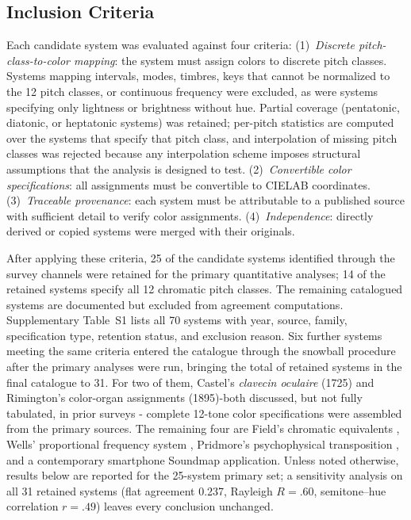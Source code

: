 \documentclass[12pt]{article}
\begin{document}
\subsection{Inclusion Criteria}
Each candidate system was evaluated against four criteria:
(1)~\textit{Discrete pitch-class-to-color mapping}: the system must
assign colors to discrete pitch classes. Systems mapping intervals,
modes, timbres, keys that cannot be normalized to the 12 pitch
classes, or continuous frequency were excluded, as were systems
specifying only lightness or brightness without hue. Partial coverage
(pentatonic, diatonic, or heptatonic systems) was retained; per-pitch
statistics are computed over the systems that specify that pitch
class, and interpolation of missing pitch classes was rejected because
any interpolation scheme imposes structural assumptions that the
analysis is designed to test.
(2)~\textit{Convertible color specifications}: all assignments must
be convertible to CIELAB coordinates.
(3)~\textit{Traceable provenance}: each system must be attributable to
a published source with sufficient detail to verify color assignments.
(4)~\textit{Independence}: directly derived or copied systems were
merged with their originals.

After applying these criteria, 25 of the candidate systems identified
through the survey channels were retained for the primary quantitative
analyses; 14 of the retained systems specify all 12 chromatic pitch
classes. The remaining catalogued systems are documented but excluded
from agreement computations. Supplementary Table~S1 lists all 70
systems with year, source, family, specification type, retention
status, and exclusion reason.
Six further systems meeting the same criteria entered the catalogue
through the snowball procedure after the primary analyses were run,
bringing the total of retained systems in the final catalogue to 31.
For two of them, Castel's \textit{clavecin oculaire} (1725) and
Rimington's color-organ assignments (1895)-both discussed, but not
fully tabulated, in prior surveys \citep{peacock1988,gage1999}-%
complete 12-tone color specifications were assembled from the primary
sources. The remaining four are Field's chromatic equivalents
\citep{field1835}, Wells' proportional frequency system
\citep{wells1980}, Pridmore's psychophysical transposition
\citep{pridmore1992}, and a contemporary smartphone Soundmap
application. Unless noted otherwise, results below are reported for
the 25-system primary set; a sensitivity analysis on all 31 retained
systems (flat agreement 0.237, Rayleigh $R = .60$, semitone--hue
correlation $r = .49$) leaves every conclusion unchanged.
\end{document}
